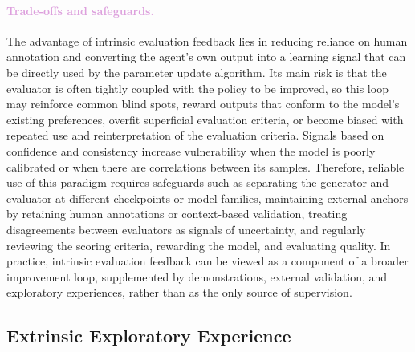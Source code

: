 \paragraph{\textcolor{Plum}{Trade-offs and safeguards.}}
The advantage of intrinsic evaluation feedback lies in reducing reliance on human annotation and converting the agent's own output into a learning signal that can be directly used by the parameter update algorithm. Its main risk is that the evaluator is often tightly coupled with the policy to be improved, so this loop may reinforce common blind spots, reward outputs that conform to the model's existing preferences, overfit superficial evaluation criteria, or become biased with repeated use and reinterpretation of the evaluation criteria. Signals based on confidence and consistency increase vulnerability when the model is poorly calibrated or when there are correlations between its samples. Therefore, reliable use of this paradigm requires safeguards such as separating the generator and evaluator at different checkpoints or model families, maintaining external anchors by retaining human annotations or context-based validation, treating disagreements between evaluators as signals of uncertainty, and regularly reviewing the scoring criteria, rewarding the model, and evaluating quality. In practice, intrinsic evaluation feedback can be viewed as a component of a broader improvement loop, supplemented by demonstrations, external validation, and exploratory experiences, rather than as the only source of supervision.


\subsection{Extrinsic Exploratory Experience}
\label{sec:Extrinsic_Exploratory_Experience}
\label{sec:Self_Generated_Experience}

